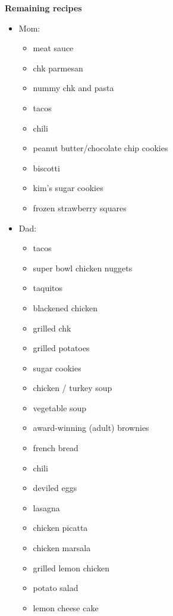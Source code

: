 \documentclass[11pt]{book}
\begin{document}
\frontmatter


\mainmatter







\newpage
\textbf{Remaining recipes}
\begin{itemize}
    \item Mom:
          \begin{itemize}
              \item meat sauce
              \item  chk parmesan
              \item  nummy chk and pasta
              \item  tacos
              \item  chili
              \item  peanut butter/chocolate chip cookies
              \item  biscotti
              \item  kim's sugar cookies
              \item  frozen strawberry squares
          \end{itemize}

    \item Dad:
          \begin{itemize}
              \item  tacos
              \item  super bowl chicken nuggets
              \item  taquitos
              \item  blackened chicken
              \item  grilled chk
              \item  grilled potatoes
              \item  sugar cookies
              \item  chicken / turkey soup
              \item  vegetable soup
              \item  award-winning (adult) brownies
              \item  french bread
              \item  chili
              \item  deviled eggs
              \item  lasagna
              \item  chicken picatta
              \item  chicken marsala
              \item  grilled lemon chicken
              \item  potato salad
              \item  lemon cheese cake
          \end{itemize}


\end{itemize}
\end{document}
